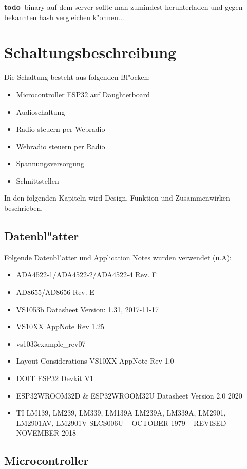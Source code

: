 \documentclass[ngerman,11pt,parskip=half] {scrartcl}
\newcommand {\todo} {\textbf{\color{red} todo\ }}
\begin{document}
\todo binary auf dem server sollte man zumindest herunterladen und gegen bekannten hash vergleichen k"onnen...


\section{Schaltungsbeschreibung} \label{sec:schaltung}

Die Schaltung besteht aus folgenden Bl"ocken:
\begin{itemize}
\item Microcontroller ESP32 auf Daughterboard
\item Audioschaltung
\item Radio steuern per Webradio
\item Webradio steuern per Radio
\item Spannungsversorgung
\item Schnittstellen
\end{itemize}

In den folgenden Kapiteln wird Design, Funktion und Zusammenwirken beschrieben.

\subsection{Datenbl"atter} \label{sec:schaltung:datenblaetter}

Folgende Datenbl"atter und Application Notes wurden verwendet (u.A):
\begin{itemize}
\item ADA4522-1/ADA4522-2/ADA4522-4 Rev. F
\item AD8655/AD8656 Rev. E
\item VS1053b Datasheet Version: 1.31, 2017-11-17
\item VS10XX AppNote Rev 1.25
\item vs1033example\_rev07
\item Layout Considerations VS10XX AppNote Rev 1.0
\item DOIT ESP32 Devkit V1
\item ESP32­WROOM­32D \& ESP32­WROOM­32U Datasheet Version 2.0 2020
\item TI LM139, LM239, LM339, LM139A LM239A, LM339A, LM2901, LM2901AV, LM2901V  SLCS006U – OCTOBER 1979 – REVISED NOVEMBER 2018
\end{itemize}

\subsection{Microcontroller} \label{sec:schaltung:Microcontroller}
\end{document}
